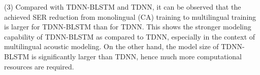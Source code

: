 \documentclass[a4paper]{article}
\begin{document}
(3) Compared with TDNN-BLSTM and TDNN,
it can be observed that the achieved  SER reduction from monolingual (CA) training to multilingual training is larger for TDNN-BLSTM than for TDNN.
This
shows the stronger modeling capability of TDNN-BLSTM as compared to TDNN, especially in the context of multilingual acoustic modeling. On the other hand, the model size of TDNN-BLSTM is significantly larger than TDNN, hence much more computational resources are required.
\end{document}
